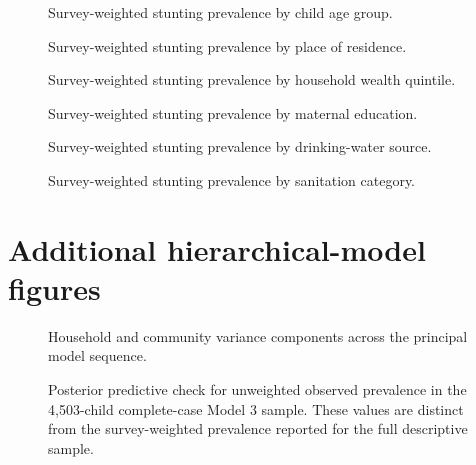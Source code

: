 \documentclass[10pt]{article}
\begin{document}
\begin{figure}[H]
\centering

\caption{Survey-weighted stunting prevalence by child age group.}
\end{figure}

\begin{figure}[H]
\centering

\caption{Survey-weighted stunting prevalence by place of residence.}
\end{figure}

\begin{figure}[H]
\centering

\caption{Survey-weighted stunting prevalence by household wealth quintile.}
\end{figure}

\begin{figure}[H]
\centering

\caption{Survey-weighted stunting prevalence by maternal education.}
\end{figure}

\begin{figure}[H]
\centering

\caption{Survey-weighted stunting prevalence by drinking-water source.}
\end{figure}

\begin{figure}[H]
\centering

\caption{Survey-weighted stunting prevalence by sanitation category.}
\end{figure}

\section{Additional hierarchical-model figures}

\begin{figure}[H]
\centering

\caption{Household and community variance components across the principal model sequence.}
\end{figure}

\begin{figure}[H]
\centering

\caption{Posterior predictive check for unweighted observed prevalence in the 4,503-child complete-case Model 3 sample. These values are distinct from the survey-weighted prevalence reported for the full descriptive sample.}
\end{figure}
\end{document}
